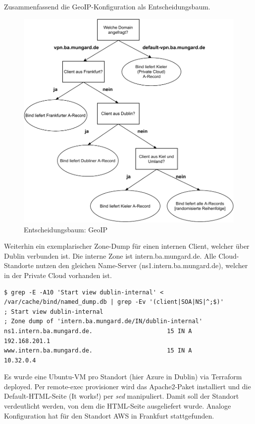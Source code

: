 Zusammenfassend die GeoIP-Konfiguration als Entscheidungsbaum.
\begin{figure}[h]
  \centering
  \includegraphics{Figures/entscheidungsbaum_bind_geoip.pdf}
  \caption{Entscheidungsbaum: GeoIP}
  \label{grafik:Use-Case_2_Entscheidungsbaum_GeoIP}
\end{figure}\FloatBarrier

Weiterhin ein exemplarischer Zone-Dump für einen internen Client, welcher über Dublin verbunden ist. Die interne Zone ist intern.ba.mungard.de. Alle Cloud-Standorte nutzen den gleichen Name-Server (ns1.intern.ba.mungard.de), welcher in der Private Cloud vorhanden ist.\\

\begin{lstlisting}[label=tf-provider-dns,caption=.]
$ grep -E -A10 'Start view dublin-internal' < /var/cache/bind/named_dump.db | grep -Ev '(client|SOA|NS|^;$)'
; Start view dublin-internal
; Zone dump of 'intern.ba.mungard.de/IN/dublin-internal'
ns1.intern.ba.mungard.de.                     15 IN A           192.168.201.1
www.intern.ba.mungard.de.                     15 IN A           10.32.0.4
\end{lstlisting}

Es wurde eine Ubuntu-VM pro Standort (hier Azure in Dublin) via Terraform deployed. Per remote-exec provisioner wird das Apache2-Paket installiert und die Default-HTML-Seite (\glqq It works!\grqq{}) per \textit{sed} manipuliert. Damit soll der Standort verdeutlicht werden, von dem die HTML-Seite ausgeliefert wurde. Analoge Konfiguration hat für den Standort AWS in Frankfurt stattgefunden.

